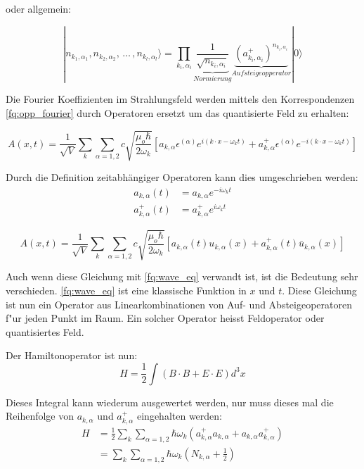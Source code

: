 oder allgemein:

\begin{equation}
|n_{k_1,\alpha_1}, n_{k_2,\alpha_2}, \, \hdots \, , n_{k_l,\alpha_l}\rangle =
 \prod_{k_i,\alpha_i}\underbrace{\frac{1}{\sqrt{n_{k_i,\alpha_i}}}}_{Normierung} \underbrace{(a^+_{k_i,\alpha_i})^{n_{k_i,\alpha_i}}}_{Aufsteigeopperator} |0\rangle
\end{equation}

Die Fourier Koeffizienten im Strahlungsfeld werden mittels den Korrespondenzen \ref{fq:opp_fourier} durch Operatoren ersetzt um das quantisierte Feld zu erhalten:

\begin{equation}
A(x,t) = \frac{1}{\sqrt{V}} \sum_k \sum_{\alpha=1,2} c \sqrt{\frac{\mu_o \hbar}{2 \omega_k}} \left[a_{k,\alpha} \epsilon^{(\alpha)} e^{i (k \cdot x - \omega_k t)} + a^+_{k,\alpha} \epsilon^{(\alpha)} e^{-i (k \cdot x - \omega_k t)}\right]
\end{equation}

Durch die Definition zeitabhängiger Operatoren kann dies umgeschrieben werden:
\begin{equation}
\begin{split}
a_{k,\alpha}(t) &= a_{k,\alpha} e^{-i \omega_k t} \\
a^+_{k,\alpha}(t) &= a^+_{k,\alpha} e^{i \omega_k t}
\end{split}
\end{equation}

\begin{equation}
A(x,t) = \frac{1}{\sqrt{V}} \sum_k \sum_{\alpha=1,2} c \sqrt{\frac{\mu_o \hbar}{2 \omega_k}}\left[a_{k,\alpha}(t) u_{k,\alpha}(x) + a^+_{k,\alpha}(t) \bar{u}_{k,\alpha}(x) \right]
\end{equation}

Auch wenn diese Gleichung mit \ref{fq:wave_eq} verwandt ist, ist die Bedeutung sehr verschieden. \ref{fq:wave_eq} ist eine klassische Funktion in $x$ und $t$. Diese Gleichung ist nun ein Operator aus Linearkombinationen von Auf- und Absteigeoperatoren f"ur jeden Punkt im Raum. Ein solcher Operator heisst Feldoperator oder quantisiertes Feld.

Der Hamiltonoperator ist nun:
\begin{equation}
H = \frac{1}{2} \int (B \cdot B + E \cdot E) d^3 x
\end{equation}

Dieses Integral kann wiederum ausgewertet werden, nur muss dieses mal die Reihenfolge von $a_{k,\alpha}$ und $a^+_{k,\alpha}$ eingehalten werden:
\begin{equation}
\begin{split}
H &= \frac{1}{2} \sum_k \sum_{\alpha=1,2} \hbar \omega_k (a^+_{k,\alpha} a_{k,\alpha} + a_{k,\alpha} a^+_{k,\alpha}) \\
&= \sum_k \sum_{\alpha=1,2} \hbar \omega_k (N_{k,\alpha} + \frac{1}{2} )
\end{split}
\end{equation}

